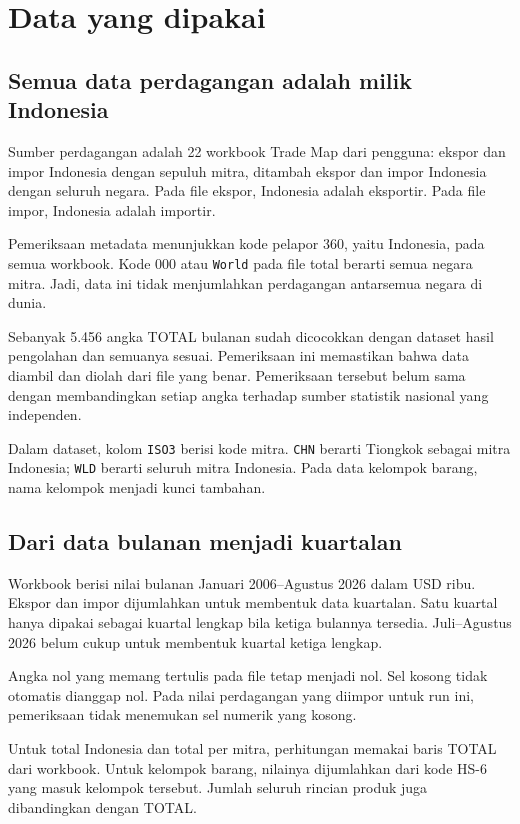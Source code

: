 \section{Data yang dipakai}\label{sec:data}
\subsection{Semua data perdagangan adalah milik Indonesia}
Sumber perdagangan adalah 22 workbook Trade Map dari pengguna: ekspor dan impor Indonesia dengan sepuluh mitra, ditambah ekspor dan impor Indonesia dengan seluruh negara. Pada file ekspor, Indonesia adalah eksportir. Pada file impor, Indonesia adalah importir.

Pemeriksaan metadata menunjukkan kode pelapor 360, yaitu Indonesia, pada semua workbook. Kode 000 atau \texttt{World} pada file total berarti semua negara mitra. Jadi, data ini tidak menjumlahkan perdagangan antarsemua negara di dunia.

Sebanyak 5.456 angka TOTAL bulanan sudah dicocokkan dengan dataset hasil pengolahan dan semuanya sesuai. Pemeriksaan ini memastikan bahwa data diambil dan diolah dari file yang benar. Pemeriksaan tersebut belum sama dengan membandingkan setiap angka terhadap sumber statistik nasional yang independen.

Dalam dataset, kolom \texttt{ISO3} berisi kode mitra. \texttt{CHN} berarti Tiongkok sebagai mitra Indonesia; \texttt{WLD} berarti seluruh mitra Indonesia. Pada data kelompok barang, nama kelompok menjadi kunci tambahan.

\subsection{Dari data bulanan menjadi kuartalan}
Workbook berisi nilai bulanan Januari 2006--Agustus 2026 dalam USD ribu. Ekspor dan impor dijumlahkan untuk membentuk data kuartalan. Satu kuartal hanya dipakai sebagai kuartal lengkap bila ketiga bulannya tersedia. Juli--Agustus 2026 belum cukup untuk membentuk kuartal ketiga lengkap.

Angka nol yang memang tertulis pada file tetap menjadi nol. Sel kosong tidak otomatis dianggap nol. Pada nilai perdagangan yang diimpor untuk run ini, pemeriksaan tidak menemukan sel numerik yang kosong.

Untuk total Indonesia dan total per mitra, perhitungan memakai baris TOTAL dari workbook. Untuk kelompok barang, nilainya dijumlahkan dari kode HS-6 yang masuk kelompok tersebut. Jumlah seluruh rincian produk juga dibandingkan dengan TOTAL.

